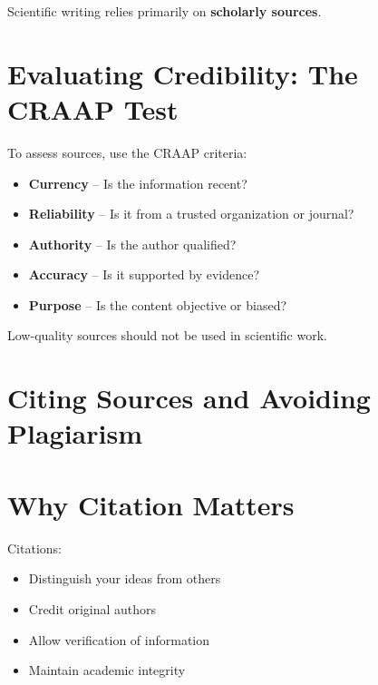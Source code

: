 \documentclass[
  letterpaper,
  DIV=11,
  numbers=noendperiod]{scrreprt}
\begin{document}
Scientific writing relies primarily on \textbf{scholarly sources}.

\section*{\texorpdfstring{\textbf{Evaluating Credibility: The CRAAP
Test}}{Evaluating Credibility: The CRAAP Test}}\label{evaluating-credibility-the-craap-test}


To assess sources, use the CRAAP criteria:

\begin{itemize}
\item
  \textbf{Currency} -- Is the information recent?
\item
  \textbf{Reliability} -- Is it from a trusted organization or journal?
\item
  \textbf{Authority} -- Is the author qualified?
\item
  \textbf{Accuracy} -- Is it supported by evidence?
\item
  \textbf{Purpose} -- Is the content objective or biased?
\end{itemize}

Low-quality sources should not be used in scientific work.

\section*{\texorpdfstring{\textbf{Citing Sources and Avoiding
Plagiarism}}{Citing Sources and Avoiding Plagiarism}}\label{citing-sources-and-avoiding-plagiarism}


\section*{\texorpdfstring{\textbf{Why Citation
Matters}}{Why Citation Matters}}\label{why-citation-matters}


Citations:

\begin{itemize}
\item
  Distinguish your ideas from others
\item
  Credit original authors
\item
  Allow verification of information
\item
  Maintain academic integrity
\end{itemize}
\end{document}
